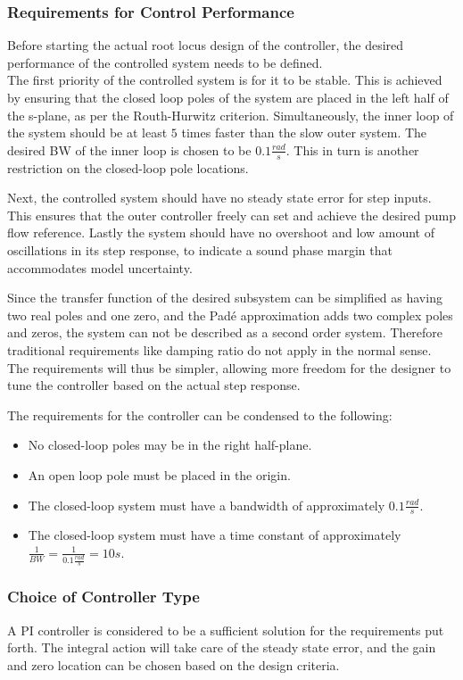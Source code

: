 \subsubsection{Requirements for Control Performance}
Before starting the actual root locus design of the controller, the desired performance of the controlled system needs to be defined. \\
The first priority of the controlled system is for it to be stable. This is achieved by ensuring that the closed loop poles of the system are placed in the left half of the s-plane, as per the Routh-Hurwitz criterion. Simultaneously, the inner loop of the system should be at least $5$ times faster than the slow outer system. The desired BW of the inner loop is chosen to be $0.1 \si{\frac{rad}{s}}$. This in turn is another restriction on the closed-loop pole locations.

Next, the controlled system should have no steady state error for step inputs. This ensures that the outer controller freely can set and achieve the desired pump flow reference. Lastly the system should have no overshoot and low amount of oscillations in its step response, to indicate a sound phase margin that accommodates model uncertainty.

Since the transfer function of the desired subsystem can be simplified as having two real poles and one zero, and the Padé approximation adds two complex poles and zeros, the system can not be described as a second order system. Therefore traditional requirements like damping ratio do not apply in the normal sense. The requirements will thus be simpler, allowing more freedom for the designer to tune the controller based on the actual step response.

The requirements for the controller can be condensed to the following: 
\begin{itemize}
	\item No closed-loop poles may be in the right half-plane.
	\item An open loop pole must be placed in the origin.
	\item The closed-loop system must have a bandwidth of approximately $0.1 \si{\frac{rad}{s}}$.
	\item The closed-loop system must have a time constant of approximately $\frac{1}{BW} = \frac{1}{0.1 \si{\frac{rad}{s}}} = 10 \si{s}$.
\end{itemize}



\subsubsection{Choice of Controller Type}
A PI controller is considered to be a sufficient solution for the requirements put forth. The integral action will take care of the steady state error, and the gain and zero location can be chosen based on the design criteria.

